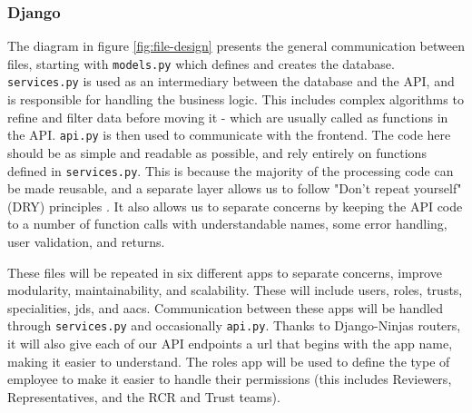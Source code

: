 \subsubsection{Django}
The diagram in figure \ref{fig:file-design} presents the general communication between files, starting with \texttt{models.py} which defines and creates the database. \texttt{services.py} is used as an intermediary between the database and the API, and is responsible for handling the business logic. This includes complex algorithms to refine and filter data before moving it - which are usually called as functions in the API. \texttt{api.py} is then used to communicate with the frontend. The code here should be as simple and readable as possible, and rely entirely on functions defined in \texttt{services.py}. This is because the majority of the processing code can be made reusable, and a separate layer allows us to follow "Don't repeat yourself" (DRY) principles \parencite{thomas_pragmatic_2019}. It also allows us to separate concerns \parencite{reade_elements_1989} by keeping the API code to a number of function calls with understandable names, some error handling, user validation, and returns.

These files will be repeated in six different apps to separate concerns, improve modularity, maintainability, and scalability. These will include users, roles, trusts, specialities, jds, and aacs. Communication between these apps will be handled through \texttt{services.py} and occasionally \texttt{api.py}. Thanks to Django-Ninjas routers, it will also give each of our API endpoints a url that begins with the app name, making it easier to understand. The roles app will be used to define the type of employee to make it easier to handle their permissions (this includes Reviewers, Representatives, and the RCR and Trust teams).

